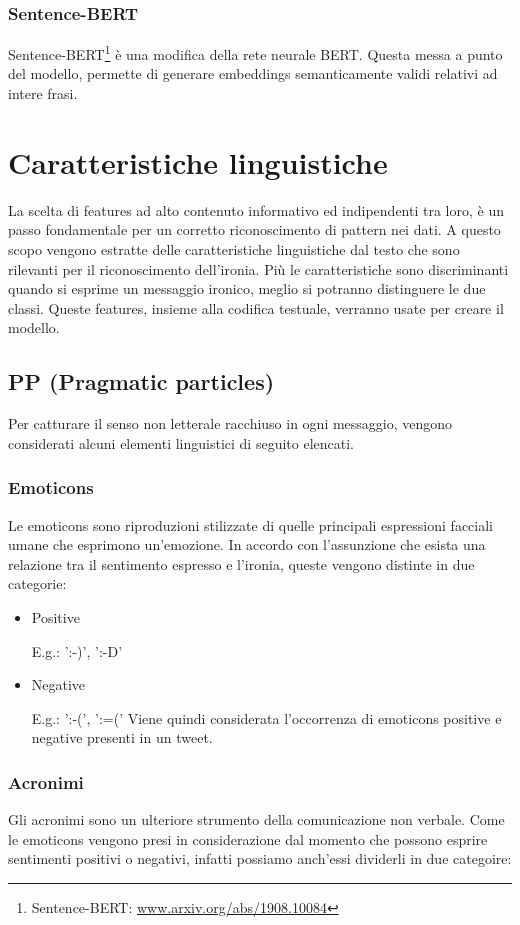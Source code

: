 \documentclass[oneside]{book}
\begin{document}
\subsubsection{Sentence-BERT}
Sentence-BERT\footnote{Sentence-BERT: \url{www.arxiv.org/abs/1908.10084}} è una modifica della rete neurale BERT. Questa messa a punto del modello, permette di generare embeddings semanticamente validi relativi ad intere frasi.


\section{Caratteristiche linguistiche}
La scelta di features ad alto contenuto informativo ed indipendenti tra loro, è un passo fondamentale per un corretto riconoscimento di pattern nei dati.
A questo scopo vengono estratte delle caratteristiche linguistiche dal testo che sono rilevanti per il riconoscimento dell'ironia. Più le caratteristiche sono discriminanti quando si esprime un messaggio ironico, meglio si potranno distinguere le due classi. Queste features, insieme alla codifica testuale, verranno usate per creare il modello.

\subsection{PP (Pragmatic particles)}
Per catturare il senso non letterale racchiuso in ogni messaggio, vengono considerati alcuni elementi linguistici di seguito elencati.

\subsubsection{Emoticons}
Le emoticons sono riproduzioni stilizzate di quelle principali espressioni facciali umane che esprimono un'emozione. In accordo con l'assunzione che esista una relazione tra il sentimento espresso e l'ironia, queste vengono distinte in due categorie:
\begin{itemize}
	\item
	Positive
	
	E.g.: ':-)', ':-D'
	\item
	Negative
	
	E.g.: ':-(', ':=('
Viene quindi considerata l'occorrenza di emoticons positive e negative presenti in un tweet.
\end{itemize}

\subsubsection{Acronimi}
Gli acronimi sono un ulteriore strumento della comunicazione non verbale. Come le emoticons vengono presi in considerazione dal momento che possono esprire sentimenti positivi o negativi, infatti possiamo anch'essi dividerli in due categoire:
\end{document}
